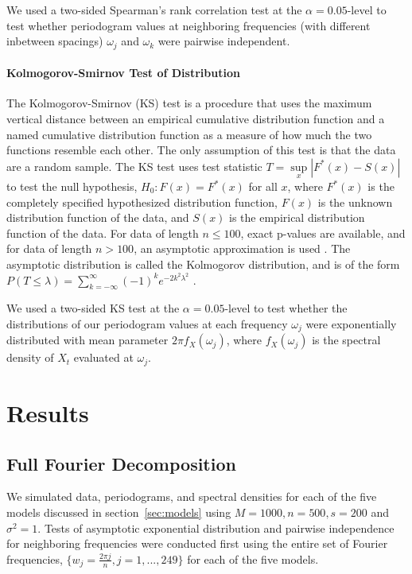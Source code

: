 \documentclass{article}\usepackage{graphicx, color}
\theoremstyle{plain}
\begin{document}
We used a two-sided Spearman's rank correlation test at the $\alpha = 0.05$-level to test whether periodogram values at neighboring frequencies (with different inbetween spacings) $\omega_j$ and $\omega_k$ were pairwise independent.


\paragraph{Kolmogorov-Smirnov Test of Distribution}
The Kolmogorov-Smirnov (KS) test is a procedure that uses the maximum vertical distance between an empirical cumulative distribution function and a named cumulative distribution function as a measure of how much the two functions resemble each other. The only assumption of this test is that the data are a random sample. The KS test uses test statistic $T = \sup\limits_x |F^*(x) - S(x)|$ to test the null hypothesis, $H_0: F(x) = F^*(x)$ for all $x$, where $F^*(x)$ is the completely specified hypothesized distribution function, $F(x)$ is the unknown distribution function of the data, and $S(x)$ is the empirical distribution function of the data. For data of length $n \le 100$, exact p-values are available, and for data of length $n > 100$, an asymptotic approximation is used \cite{conover1998practical}. The asymptotic distribution is called the Kolmogorov distribution, and is of the form $P(T \le \lambda) = \sum_{k=-\infty}^\infty (-1)^k e^{-2k^2 \lambda^2}$ \cite{kolmogorov1992empirical}.

We used a two-sided KS test at the $\alpha = 0.05$-level to test whether the distributions of our periodogram values at each frequency $\omega_j$ were exponentially distributed with mean parameter $2\pi f_X(\omega_j)$, where $f_X(\omega_j)$ is the spectral density of $X_t$ evaluated at $\omega_j$.




\section{Results}




\subsection{Full Fourier Decomposition}

We simulated data, periodograms, and spectral densities for each of the five models discussed in section~\ref{sec:models} using $M=1000, n=500, s=200$ and $\sigma^2=1$. Tests of asymptotic exponential distribution and pairwise independence for neighboring frequencies were conducted first using the entire set of Fourier frequencies, $\{w_j = \frac{2\pi j}{n}, j=1,...,249\}$ for each of the five models.
\end{document}
